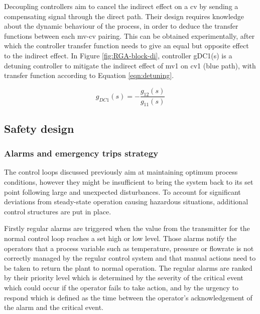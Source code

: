 Decoupling controllers aim to cancel the indirect effect on a cv by sending a compensating signal through the direct path. Their design requires knowledge about the dynamic behaviour of the process, in order to deduce the transfer functions between each mv-cv pairing. This can be obtained experimentally, after which the controller transfer function needs to give an equal but opposite effect to the indirect effect. In Figure \ref{fig:RGA-block-di}, controller gDC1(s) is a detuning controller to mitigate the indirect effect of mv1 on cv1 (blue path), with transfer function according to Equation \ref{eqn:detuning}.

\begin{equation}
\label{eqn:detuning}
g_{DC1}(s)=-\frac{g_{12}(s)}{g_{11}(s)}
\end{equation}

\subsection{Safety design} %

\subsubsection{Alarms and emergency trips strategy}
The control loops discussed previously aim at maintaining optimum process conditions, however they might be insufficient to bring the system back to its set point following large and unexpected disturbances. To account for significant deviations from steady-state operation causing hazardous situations, additional control structures are put in place.  

Firstly regular alarms are triggered when the value from the transmitter for the normal control loop reaches a set high or low level. Those alarms notify the operators that a process variable such as temperature, pressure or flowrate is not correctly managed by the regular control system and that manual actions need to be taken to return the plant to normal operation. The regular alarms are ranked by their priority level which is determined by the severity of the critical event which could occur if the operator fails to take action, and by the urgency to respond which is defined as the time between the operator's acknowledgement of the alarm and the critical event. 

